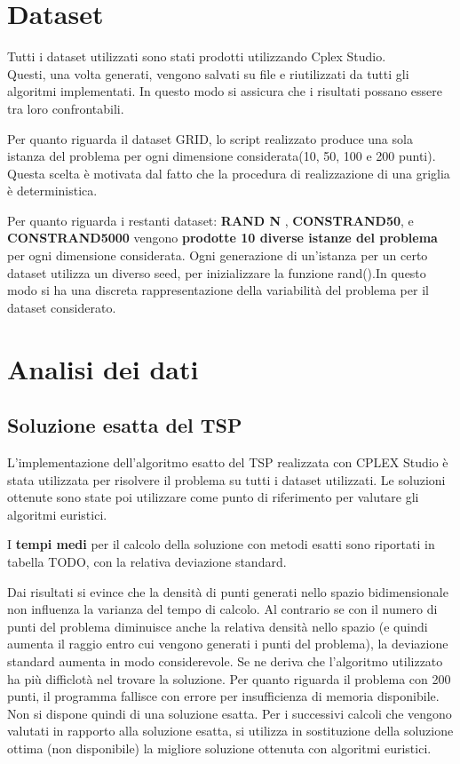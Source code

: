 \section{Dataset}
	
	Tutti i dataset utilizzati sono stati prodotti utilizzando Cplex Studio. \\
	Questi, una volta generati, vengono salvati su file e riutilizzati da tutti gli algoritmi implementati. In questo modo si assicura che i risultati possano essere tra loro confrontabili. 
	
	Per quanto riguarda il dataset GRID, lo script realizzato produce una sola istanza del problema per ogni dimensione considerata(10, 50, 100 e 200 punti). Questa scelta è motivata dal fatto che la procedura di realizzazione di una griglia è deterministica. 
	
	Per quanto riguarda i restanti dataset: \textbf{RAND N }, \textbf{CONSTRAND50}, e \textbf{CONSTRAND5000} vengono \textbf{prodotte 10 diverse istanze del problema} per ogni dimensione considerata. Ogni generazione di un’istanza per un certo dataset utilizza un diverso seed, per inizializzare la funzione rand().In questo modo si ha una discreta rappresentazione della variabilità del problema per il dataset considerato.
\section{Analisi dei dati}

\subsection{Soluzione esatta del TSP}	
	L’implementazione dell’algoritmo esatto del TSP realizzata con CPLEX Studio è stata utilizzata per risolvere il problema su tutti i dataset utilizzati. Le soluzioni ottenute sono state poi utilizzare come punto di riferimento per valutare gli algoritmi euristici.

	I\textbf{ tempi medi} per il calcolo della soluzione con metodi esatti sono riportati in tabella 
    TODO, con la relativa deviazione standard. 

	Dai risultati si evince che la densità di punti generati nello spazio bidimensionale non influenza la varianza del tempo di calcolo. Al contrario se con il numero di punti del problema  diminuisce anche la relativa densità nello spazio (e quindi aumenta il raggio entro cui vengono generati i punti del problema), la deviazione standard aumenta in modo considerevole. Se ne deriva che l’algoritmo utilizzato ha più difficlotà nel trovare la soluzione. 
	Per quanto riguarda il problema con 200 punti, il programma fallisce con errore per insufficienza di memoria disponibile. Non si dispone quindi di una soluzione esatta. Per i successivi calcoli che vengono valutati in rapporto alla soluzione esatta, si utilizza in sostituzione della soluzione ottima (non disponibile) la migliore soluzione ottenuta con algoritmi euristici.  

